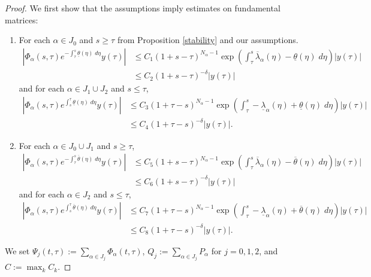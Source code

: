 \documentclass[a4paper,11pt]{article}
\newcommand{\upl}{\overline{\lambda}}
\newcommand{\udl}{\underline{\lambda}}
\newcommand{\tl}{{\underline{\theta}}}
\newcommand{\tu}{{\overline{\theta}}}
\theoremstyle{remark}
\begin{document}
\begin{proof}
We first show that the assumptions imply estimates on fundamental matrices: %
\begin{enumerate}
\item For each $\alpha \in J_0$ and $s\ge \tau$ from Proposition \ref{stability} and our assumptions. 
\begin{align}
\left|\Phi_\alpha(s,\tau)e^{-\int_\tau^s \tl(\eta) \;d\eta}y(\tau)\right| &\le C_1(1 + s-\tau)^{N_\alpha-1}\exp\left(\int_\tau^s \upl_\alpha(\eta)-\tl(\eta) \;d\eta\right)|y(\tau)| \nonumber\\
&\le C_2(1 + s-\tau)^{-\delta}|y(\tau)| \label{eq:decay1}
\end{align}
and for each $\alpha \in J_1\cup J_2$ and $s\le \tau$,
\begin{align}
\left|\Phi_\alpha(s,\tau)e^{\int_s^\tau \tl(\eta)\;d\eta}y(\tau)\right| &\le C_3(1 + \tau -s)^{N_\alpha-1}\exp\left(\int_\tau^s -\udl_\alpha(\eta)+\tl(\eta) \; d\eta\right)|y(\tau)| \nonumber\\
&\le C_4(1 + \tau-s)^{-\delta}|y(\tau)|. \label{eq:decay2}
\end{align}
\item For each $\alpha \in J_0\cup J_1$ and $s\ge \tau$,
\begin{align}
\left|\Phi_\alpha(s,\tau)e^{-\int_\tau^s \tu(\eta) \;d\eta}y(\tau)\right| &\le C_5(1 + s-\tau)^{N_\alpha-1}\exp\left(\int_\tau^s \upl_\alpha(\eta)-\tu(\eta) \;d\eta\right)|y(\tau)| \nonumber\\
&\le C_6(1 + s-\tau)^{-\delta}|y(\tau)| \label{eq:decay3}
\end{align}
and for each $\alpha \in J_2$ and $s\le \tau$,
\begin{align}
\left|\Phi_\alpha(s,\tau)e^{\int_s^\tau \tu(\eta)\;d\eta}y(\tau)\right| &\le C_7(1 + \tau -s)^{N_\alpha-1}\exp\left(\int_\tau^s -\udl_\alpha(\eta)+\tu(\eta) \; d\eta\right)|y(\tau)| \nonumber\\
&\le C_8(1 + \tau-s)^{-\delta}|y(\tau)|. \label{eq:decay4}
\end{align}
\end{enumerate}
We set $\Psi_j(t,\tau):=\displaystyle \sum_{\alpha\in J_j} \Phi_\alpha(t,\tau)$, $Q_j:= \displaystyle \sum_{\alpha\in J_j} P_\alpha$ for $j=0,1,2$, and $C:=\max_{k} {C_k}$.


\end{proof}
\end{document}
